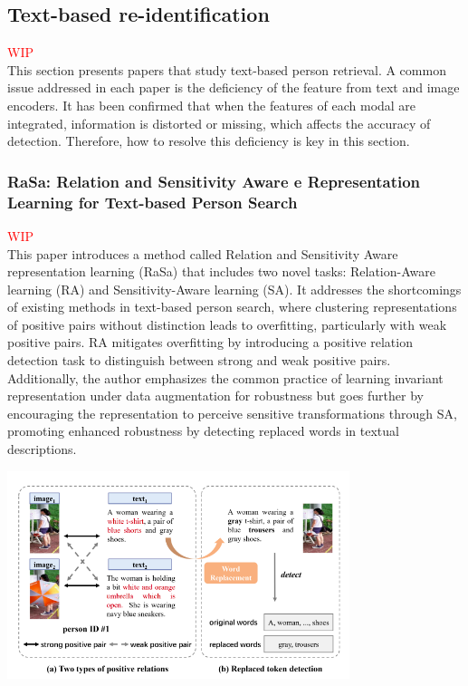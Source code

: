 \subsection{Text-based re-identification}
\textcolor{red}{WIP}\\
This section presents papers that study text-based person retrieval. A common issue addressed in each paper is the deficiency of the feature from text and image encoders. It has been confirmed that when the features of each modal are integrated, information is distorted or missing, which affects the accuracy of detection. Therefore, how to resolve this deficiency is key in this section.

\subsubsection{RaSa: Relation and Sensitivity Aware e Representation Learning for Text-based Person Search}
\textcolor{red}{WIP}\\
This paper introduces a method called Relation and Sensitivity Aware representation learning (RaSa) that includes two novel tasks: Relation-Aware learning (RA) and Sensitivity-Aware learning (SA). It addresses the shortcomings of existing methods in text-based person search, where clustering representations of positive pairs without distinction leads to overfitting, particularly with weak positive pairs. RA mitigates overfitting by introducing a positive relation detection task to distinguish between strong and weak positive pairs. Additionally, the author emphasizes the common practice of learning invariant representation under data augmentation for robustness but goes further by encouraging the representation to perceive sensitive transformations through SA, promoting enhanced robustness by detecting replaced words in textual descriptions.

\includegraphics[width=10cm]{img/rasa.png}


